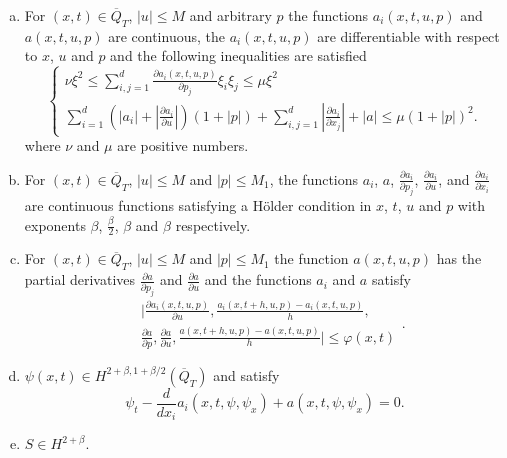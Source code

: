 \documentclass[11pt, a4paper]{article}
\begin{document}
\begin{appendices}
\begin{theorem}
\begin{enumerate}[a)]
	\item For $(x,t) \in \overline{Q}_T$, $|u| \leq M$ and arbitrary $p$ the functions $a_i(x,t,u,p)$ and $a(x,t,u,p)$ are continuous, the $a_i(x,t,u,p)$ are differentiable with respect to $x$, $u$ and $p$ and the following inequalities are satisfied
	\begin{equation}
	\label{exist_cond3}
		\begin{cases}
			\nu\xi^2 \leq \sum_{i,j=1}^d\frac{\partial a_i(x,t,u,p)}{\partial p_j}\xi_i \xi_j \leq \mu \xi^2 \\
			\sum_{i=1}^d \left(|a_i| + |\frac{\partial a_i}{\partial u}|\right)(1+|p|) + \sum_{i,j=1}^d |\frac{\partial a_i}{\partial x_j}| + |a| \leq \mu (1 + |p|)^2. 		
		\end{cases}
	\end{equation}
	where $\nu$ and $\mu$ are positive numbers.
	
	\item For $(x,t) \in \overline{Q}_T$, $|u| \leq M$ and $|p| \leq M_1$, the functions $a_i$, $a$, $\frac{\partial a_i}{\partial p_j}$, $\frac{\partial a_i}{\partial u}$, and $\frac{\partial a_i}{\partial x_i}$ are continuous functions satisfying a Hölder condition in $x$, $t$, $u$ and $p$ with exponents $\beta$, $\frac{\beta}{2}$, $\beta$ and $\beta$ respectively.
	
	\item For $(x,t) \in \overline{Q}_T$, $|u| \leq M$ and $|p| \leq M_1$ the function $a(x,t,u,p)$ has the partial derivatives $\frac{\partial a}{\partial p_j}$ and $\frac{\partial a}{\partial u}$ and the functions $a_i$ and $a$ satisfy
	\begin{equation}
	\label{exist_cond4}
	\begin{split}
		&\Bigg| \frac{\partial a_i(x,t,u,p)}{\partial u}, \frac{a_i(x,t+h,u,p) - 		a_i(x,t,u,p)}{h}, \\
		&\frac{\partial a}{\partial p}, \frac{\partial a}{\partial u}, \frac{a(x,t+h,u,p) - a(x,t,u,p)}{h} \Bigg| \leq \varphi(x,t)
	\end{split}.
	\end{equation}
	
	\item $\psi(x,t) \in H^{2+\beta, 1+\beta/2}(\overline{Q}_T)$ and satisfy
	\begin{equation}
	\label{exist_cond5}
	\psi_t - \frac{d}{dx_i}a_i(x,t,\psi,\psi_x) + a(x,t,\psi,\psi_x) = 0.
	\end{equation}
	
	\item $S \in H^{2+\beta}$.
\end{enumerate}


\end{theorem}
\end{appendices}
\end{document}
